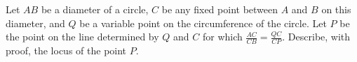 Let $ AB$ be a diameter of a circle, $ C$ be any fixed point between $ A$ and $ B$ on this diameter, and $ Q$ be a variable point on the circumference of the circle. Let $ P$ be the point on the line determined by $ Q$ and $ C$ for which $ \frac{AC}{CB}=\frac{QC}{CP}$. Describe, with proof, the locus of the point $ P$.